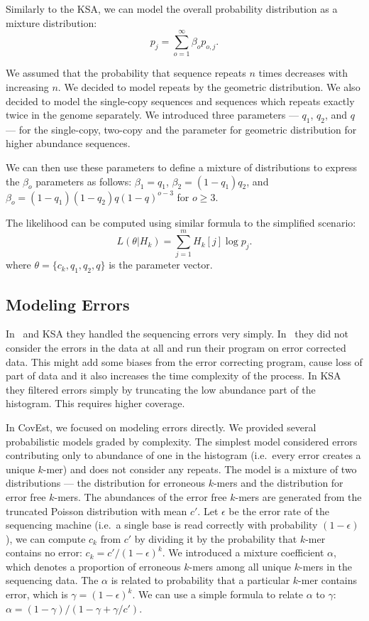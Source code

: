 Similarly to the KSA, we can model the overall probability distribution as a mixture distribution:
$$p_j = \sum_{o=1}^\infty \beta_o p_{o,j}.$$

We assumed that the probability that sequence repeats $n$ times decreases with increasing $n$. We decided to model repeats by the geometric distribution. We also decided to model the single-copy sequences and sequences which repeats exactly twice in the genome separately. We introduced three parameters --- $q_1$, $q_2$, and $q$ --- for the single-copy, two-copy and the parameter for geometric distribution for higher abundance sequences.

We can then use these parameters to define a mixture of distributions to express the $\beta_o$ parameters as follows:
$\beta_1 = q_1$, $\beta_2 = (1-q_1) q_2$, and $\beta_o =
(1-q_1)(1-q_2)q{(1-q)}^{o-3}$ for $o\ge 3$.

The likelihood can be computed using similar formula to the simplified scenario:
$$L(\theta | H_k) = \sum_{j=1}^m H_k[j] \log p_j.$$
where $\theta = \{c_k, q_1, q_2, q\}$ is the parameter vector.

\subsection{Modeling Errors}

In~\cite{waterman} and KSA\cite{williams} they handled the sequencing errors very simply. In~\cite{waterman} they did not consider the errors in the data at all and run their program on error corrected data. This might add some biases from the error correcting program, cause loss of part of data and it also increases the time complexity of the process. In KSA they filtered errors simply by truncating the low abundance part of the histogram. This requires higher coverage.

In CovEst\cite{covest}, we focused on modeling errors directly. We provided several probabilistic models graded by complexity.
The simplest model considered errors contributing only to abundance of one in the histogram (i.e.\ every error creates a unique $k$-mer) and does not consider any repeats.
The model is a mixture of two distributions --- the distribution for erroneous $k$-mers and the distribution for error free $k$-mers. The abundances of the error free $k$-mers are generated from the truncated Poisson distribution with mean $c'$.
Let $\epsilon$ be the error rate of the sequencing machine (i.e.\ a single base is read correctly with probability $(1-\epsilon)$), we can compute $c_k$ from $c'$ by dividing it by the probability that $k$-mer contains no error: $c_k = c'/{(1-\epsilon)}^k$.
We introduced a mixture coefficient $\alpha$, which denotes a proportion of erroneous $k$-mers among all unique $k$-mers in the sequencing data. The $\alpha$ is related to probability that a particular $k$-mer contains error, which is $\gamma = {(1-\epsilon)}^k$.
We can use a simple formula to relate $\alpha$ to $\gamma$: $\alpha = (1-\gamma)/(1-\gamma+\gamma/c')$\cite{covest}.

